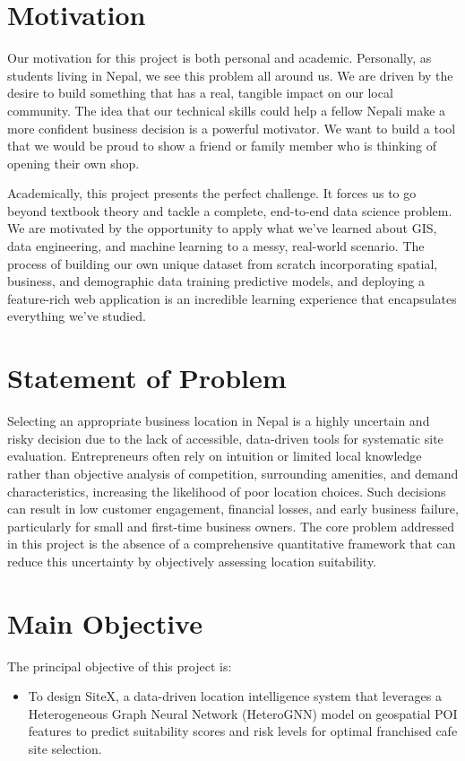 \section{Motivation}

Our motivation for this project is both personal and academic. Personally, as students living in Nepal, we see this problem all around us. We are driven by the desire to build something that has a real, tangible impact on our local community. The idea that our technical skills could help a fellow Nepali make a more confident business decision is a powerful motivator. We want to build a tool that we would be proud to show a friend or family member who is thinking of opening their own shop.

Academically, this project presents the perfect challenge. It forces us to go beyond textbook theory and tackle a complete, end-to-end data science problem. We are motivated by the opportunity to apply what we've learned about GIS, data engineering, and machine learning to a messy, real-world scenario. The process of building our own unique dataset from scratch  incorporating spatial, business, and demographic data  training predictive models, and deploying a feature-rich web application is an incredible learning experience that encapsulates everything we've studied.

\section{Statement of Problem}

Selecting an appropriate business location in Nepal is a highly uncertain and risky decision due to the lack of accessible, data-driven tools for systematic site evaluation. Entrepreneurs often rely on intuition or limited local knowledge rather than objective analysis of competition, surrounding amenities, and demand characteristics, increasing the likelihood of poor location choices. Such decisions can result in low customer engagement, financial losses, and early business failure, particularly for small and first-time business owners. The core problem addressed in this project is the absence of a comprehensive quantitative framework that can reduce this uncertainty by objectively assessing location suitability.


\section{Main Objective}

The principal objective of this project is:
\begin{itemize}
	\item {To design SiteX, a data-driven location intelligence system that leverages a Heterogeneous Graph Neural Network (HeteroGNN) model on geospatial POI features to predict suitability scores and risk levels for optimal franchised cafe site selection.}
\end{itemize}

